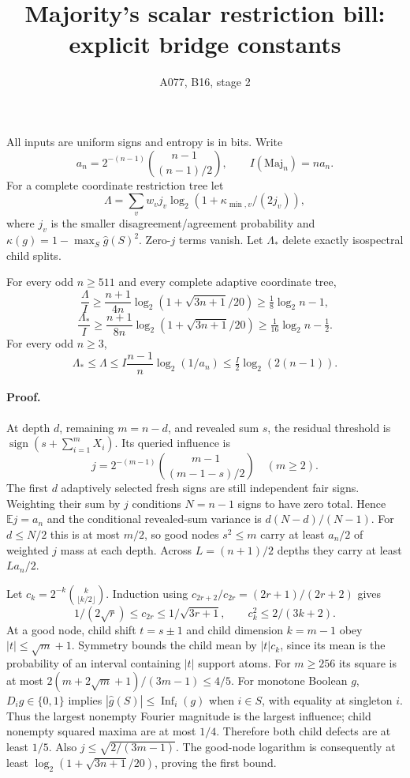 \documentclass{article}
\begin{document}
\title{Majority's scalar restriction bill: explicit bridge constants}
\author{A077, B16, stage 2}\maketitle
All inputs are uniform signs and entropy is in bits. Write
\[a_n=2^{-(n-1)}\binom{n-1}{(n-1)/2},\qquad I(\mathrm{Maj}_n)=na_n.\]
For a complete coordinate restriction tree let
\[\Lambda=\sum_v w_v j_v\log_2(1+\kappa_{\min,v}/(2j_v)),\]
where $j_v$ is the smaller disagreement/agreement probability and $\kappa(g)=1-\max_S\widehat g(S)^2$. Zero-$j$ terms vanish. Let $\Lambda_*$ delete exactly isospectral child splits.

For every odd $n\ge511$ and every complete adaptive coordinate tree,
\[\frac\Lambda I\ge\frac{n+1}{4n}\log_2(1+\sqrt{3n+1}/20)\ge\tfrac18\log_2n-1,\]
\[\frac{\Lambda_*}I\ge\frac{n+1}{8n}\log_2(1+\sqrt{3n+1}/20)\ge\tfrac1{16}\log_2n-\tfrac12.\]
For every odd $n\ge3$,
\[\Lambda_*\le\Lambda\le I\frac{n-1}{n}\log_2(1/a_n)\le\tfrac I2\log_2(2(n-1)).\]

\paragraph{Proof.} At depth $d$, remaining $m=n-d$, and revealed sum $s$, the residual threshold is $\operatorname{sign}(s+\sum_{i=1}^mX_i)$. Its queried influence is
\[j=2^{-(m-1)}\binom{m-1}{(m-1-s)/2}\quad(m\ge2).\]
The first $d$ adaptively selected fresh signs are still independent fair signs. Weighting their sum by $j$ conditions $N=n-1$ signs to have zero total. Hence $\mathbb E j=a_n$ and the conditional revealed-sum variance is $d(N-d)/(N-1)$. For $d\le N/2$ this is at most $m/2$, so good nodes $s^2\le m$ carry at least $a_n/2$ of weighted $j$ mass at each depth. Across $L=(n+1)/2$ depths they carry at least $La_n/2$.

Let $c_k=2^{-k}\binom{k}{\lfloor k/2\rfloor}$. Induction using $c_{2r+2}/c_{2r}=(2r+1)/(2r+2)$ gives
\[1/(2\sqrt r)\le c_{2r}\le1/\sqrt{3r+1},\qquad c_k^2\le2/(3k+2).\]
At a good node, child shift $t=s\pm1$ and child dimension $k=m-1$ obey $|t|\le\sqrt m+1$. Symmetry bounds the child mean by $|t|c_k$, since its mean is the probability of an interval containing $|t|$ support atoms. For $m\ge256$ its square is at most $2(m+2\sqrt m+1)/(3m-1)\le4/5$. For monotone Boolean $g$, $D_i g\in\{0,1\}$ implies $|\widehat g(S)|\le\operatorname{Inf}_i(g)$ when $i\in S$, with equality at singleton $i$. Thus the largest nonempty Fourier magnitude is the largest influence; child nonempty squared maxima are at most $1/4$. Therefore both child defects are at least $1/5$. Also $j\le\sqrt{2/(3m-1)}$. The good-node logarithm is consequently at least $\log_2(1+\sqrt{3n+1}/20)$, proving the first bound.
\end{document}
